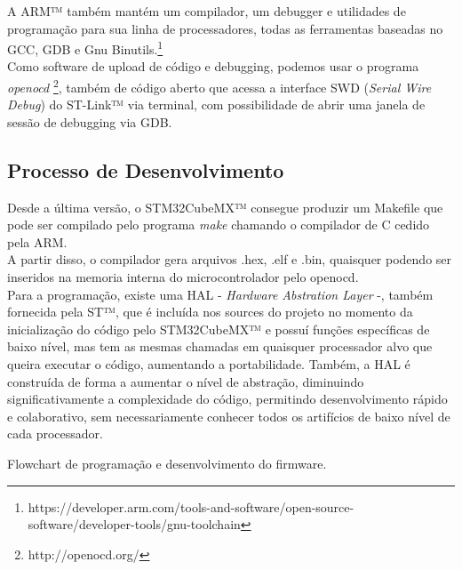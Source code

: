 \documentclass[10pt,a4paper]{report}
\begin{document}
	A ARM™ também mantém um compilador, um debugger e utilidades de programação para sua linha de processadores, todas as ferramentas baseadas no GCC, GDB e Gnu Binutils.\footnote{https://developer.arm.com/tools-and-software/open-source-software/developer-tools/gnu-toolchain}\\
	
	Como software de upload de código e debugging, podemos usar o programa {\it openocd} \footnote{http://openocd.org/}, também de código aberto que acessa a interface SWD ({\it Serial Wire Debug}) do ST-Link™ via terminal, com possibilidade de abrir uma janela de sessão de debugging via GDB.
	
	\subsection{Processo de Desenvolvimento}
	Desde a última versão, o STM32CubeMX™ consegue produzir um Makefile que pode ser compilado pelo programa {\it make} chamando o compilador de C cedido pela ARM.\\
	
	A partir disso, o compilador gera arquivos .hex, .elf e .bin, quaisquer podendo ser inseridos na memoria interna do microcontrolador pelo openocd.\\
	
	Para a programação, existe uma HAL - {\it Hardware Abstration Layer} -, também fornecida pela ST™, que é incluída nos sources do projeto no momento da inicialização do código pelo STM32CubeMX™ e possuí funções específicas de baixo nível, mas tem as mesmas chamadas em quaisquer processador alvo que queira executar o código, aumentando a portabilidade. Também, a HAL é construída de forma a aumentar o nível de abstração, diminuindo significativamente a complexidade do código, permitindo desenvolvimento rápido e colaborativo, sem necessariamente conhecer todos os artifícios de baixo nível de cada processador.
	\begin{center}
		\vspace{0.1cm}
	\footnotesize{Flowchart de programação e desenvolvimento do firmware.}
	\end{center}
\end{document}
